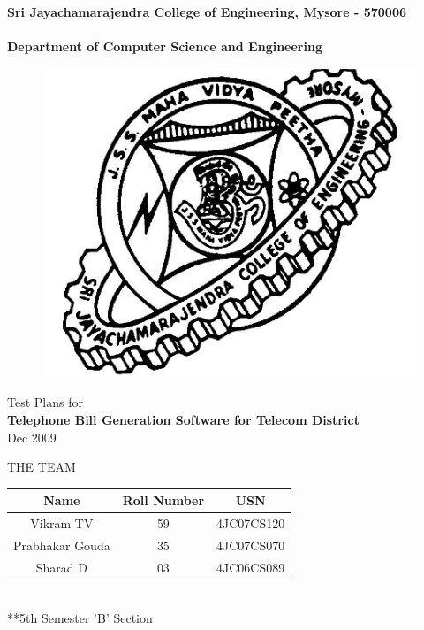\documentclass[10pt, oneside, a4paper]{article}
\begin{document}
\begin{center}

\thispagestyle{empty}
\textbf{Sri Jayachamarajendra College of Engineering, Mysore - 570006 \\}
\textbf{\\Department of Computer Science and Engineering}
\vspace{.5in}

\begin{figure}[htb]
\begin{center}
\ifpdf
\includegraphics[scale=0.50]{./logo.png}
\else
\fi
\end{center}
\end{figure}
\vspace{.5in}
Test Plans for \\
\textbf{\underline{Telephone Bill Generation Software for Telecom District}} \\
\vspace{.25in}
Dec 2009

\vspace{1in}

THE TEAM \\

\vspace{.1in}
\begin{tabular}{|c|c|c|}
\hline
 Name
& Roll Number  
& USN
\\\hline
Vikram TV 
& 59
& 4JC07CS120
\\\hline
Prabhakar Gouda
& 35
& 4JC07CS070
\\\hline
Sharad D
& 03
& 4JC06CS089
\\\hline
\end{tabular}
\\ **5th Semester 'B' Section
\end{center}
\newpage
\end{document}
